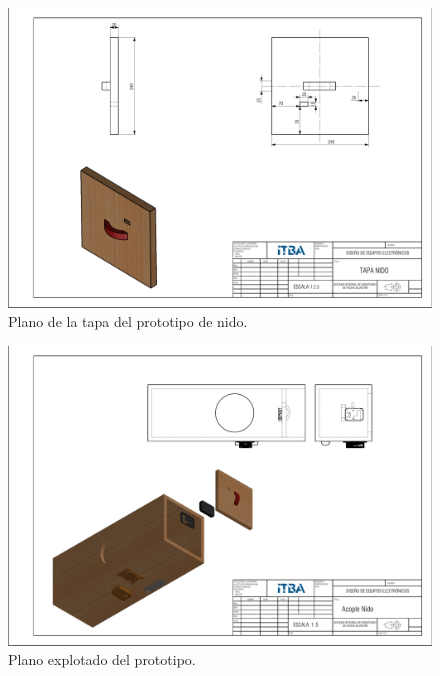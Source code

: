 \begin{figure}[H]
	\centering
	\includegraphics[width=\linewidth]{ImagenesApendice/tapa_nido_plano}
	\caption{Plano de la tapa del prototipo de nido.}
	\label{fig:tapa_nido_plano}
\end{figure}

\begin{figure}[H]
	\centering
	\includegraphics[width=\linewidth]{ImagenesApendice/explotado_nido}
	\caption{Plano explotado del prototipo.}
	\label{fig:explotado_nido_plano}
\end{figure}

